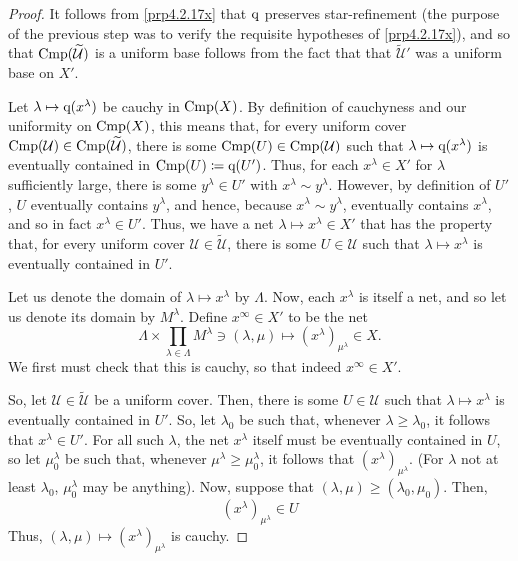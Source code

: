 \begin{thm}[Completion]
\begin{savenotes}
\begin{proof}
It follows from \cref{prp4.2.17x} that $\mathrm{q}$ preserves star-refinement (the purpose of the previous step was to verify the requisite hypotheses of \cref{prp4.2.17x}), and so that $\operatorname{Cmp} (\widetilde{\mathcal{U}})$ is a uniform base follows from the fact that that $\widetilde{\mathcal{U}}'$ was a uniform base on $X'$.

Let $\lambda \mapsto \mathrm{q} (x^\lambda )$ be cauchy in $\operatorname{Cmp} (X)$.  By definition of cauchyness and our uniformity on $\operatorname{Cmp} (X)$, this means that, for every uniform cover $\operatorname{Cmp} (\mathcal{U})\in \operatorname{Cmp} (\widetilde{\mathcal{U}})$, there is some $\operatorname{Cmp} (U)\in \operatorname{Cmp} (\mathcal{U})$ such that $\lambda \mapsto \mathrm{q} (x^\lambda )$ is eventually contained in $\operatorname{Cmp} (U)\coloneqq \mathrm{q} (U')$.  Thus, for each $x^\lambda \in X'$ for $\lambda$ sufficiently large, there is some $y^\lambda \in U'$ with $x^\lambda \sim y^\lambda$.  However, by definition of $U'$, $U$ eventually contains $y^\lambda$, and hence, because $x^\lambda \sim y^\lambda$, eventually contains $x^\lambda$, and so in fact $x^\lambda \in U'$.  Thus, we have a net $\lambda \mapsto x^\lambda \in X'$ that has the property that, for every uniform cover $\mathcal{U}\in \widetilde{\mathcal{U}}$, there is some $U\in \mathcal{U}$ such that $\lambda \mapsto x^\lambda$ is eventually contained in $U'$.

Let us denote the domain of $\lambda \mapsto x^\lambda$ by $\Lambda$.  Now, each $x^\lambda$ is itself a net, and so let us denote its domain by $M^\lambda$.  Define $x^\infty \in X'$ to be the net
\begin{equation}
\Lambda \times \prod _{\lambda \in \Lambda}M^\lambda \ni (\lambda ,\mu )\mapsto (x^\lambda )_{\mu ^\lambda}\in X.
\end{equation}
We first must check that this is cauchy, so that indeed $x^\infty \in X'$.

So, let $\mathcal{U}\in \widetilde{\mathcal{U}}$ be a uniform cover.  Then, there is some $U\in \mathcal{U}$ such that $\lambda \mapsto x^\lambda$ is eventually contained in $U'$.  So, let $\lambda _0$ be such that, whenever $\lambda \geq \lambda _0$, it follows that $x^\lambda \in U'$.  For all such $\lambda$, the net $x^\lambda$ itself must be eventually contained in $U$, so let $\mu _0^\lambda$ be such that, whenever $\mu ^\lambda \geq \mu _0^\lambda$, it follows that $(x^\lambda )_{\mu ^\lambda}$.  (For $\lambda$ not at least $\lambda _0$, $\mu _0^\lambda$ may be anything).  Now, suppose that $(\lambda ,\mu )\geq (\lambda _0,\mu _0)$.  Then,
\begin{equation}
(x^\lambda )_{\mu ^\lambda}\in U
\end{equation}
Thus, $(\lambda ,\mu )\mapsto (x^\lambda )_{\mu ^\lambda}$ is cauchy.


\end{proof}
\end{savenotes}
\end{thm}
